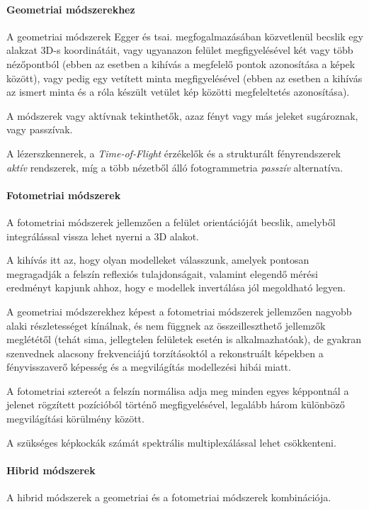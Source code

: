 \documentclass[12pt,a4]{article}
\begin{document}
	\paragraph{Geometriai módszerekhez}
	A geometriai módszerek Egger és tsai. \cite{3dmm} megfogalmazásában közvetlenül becslik egy alakzat 3D-s koordinátáit, vagy ugyanazon felület megfigyelésével
	két vagy több nézőpontból (ebben az esetben a kihívás a megfelelő pontok azonosítása a képek között), vagy pedig egy vetített minta megfigyelésével (ebben az esetben a kihívás az ismert minta és a róla készült vetület kép közötti megfeleltetés azonosítása).
	
	A módszerek vagy aktívnak tekinthetők, azaz fényt
	vagy más jeleket sugároznak, vagy passzívak.
	
	
	A lézerszkennerek, a \textit{Time-of-Flight} érzékelők és a strukturált fényrendszerek \textit{aktív} rendszerek, míg a több nézetből álló fotogrammetria \textit{passzív} alternatíva.
	
	\paragraph{Fotometriai módszerek}
	A fotometriai módszerek \cite{3dmm} jellemzően a felület orientációját becslik, amelyből integrálással vissza lehet nyerni a 3D alakot.
	
    A kihívás itt az, hogy olyan modelleket válasszunk, amelyek pontosan megragadják a felszín reflexiós tulajdonságait, valamint elegendő mérési eredményt kapjunk ahhoz, hogy e modellek invertálása jól megoldható legyen. 
    
    A geometriai módszerekhez képest a fotometriai módszerek
    jellemzően nagyobb alaki részletességet kínálnak, és nem függnek az
    összeilleszthető jellemzők meglététől
    (tehát sima, jellegtelen felületek esetén is alkalmazhatóak), de gyakran szenvednek alacsony frekvenciájú torzításoktól a rekonstruált képekben
    a fényvisszaverő képesség és a megvilágítás modellezési hibái miatt.
    
    
    A fotometriai sztereót \cite{photometric} a felszín normálisa adja meg minden egyes képpontnál a jelenet rögzített pozícióból történő megfigyelésével, legalább három különböző megvilágítási körülmény között.
    
    A szükséges képkockák számát spektrális multiplexálással \cite{multiplex} lehet csökkenteni.
    	
	\paragraph{Hibrid módszerek}
	A hibrid módszerek \cite{3dmm} a
	geometriai és a fotometriai módszerek kombinációja. 
	
\end{document}
